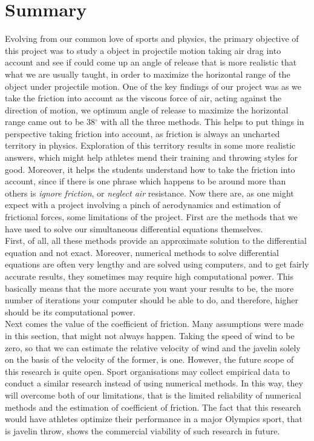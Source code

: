 \documentclass[12pt]{article}
\begin{document}
\section{Summary}
\label{sec:summary}
Evolving from our common love of sports and physics, the primary objective of this project was to study a object in projectile motion taking air drag into account and see if could come up an angle of release that is more realistic that what we are usually taught, in order to maximize the horizontal range of the object under projectile motion. One of the key findings of our project was as we take the friction into account as the viscous force of air, acting against the direction of motion, we optimum angle of release to maximize the horizontal range came out to be 38$^\circ$ with all the three methods. This helps to put things in perspective taking friction into account, as friction is always an uncharted territory in physics. Exploration of this territory results in some more realistic answers, which might help athletes mend their training and throwing styles for good. Moreover, it helps the students understand how to take the friction into account, since if there is one phrase which happens to be around more than others is \textit{ignore friction}, or \textit{neglect air} resistance. Now there are, as one might expect with a project involving a pinch of aerodynamics and estimation of frictional forces, some limitations of the project. First are the methods that we have used to solve our simultaneous differential equations themselves. \\
First, of all, all these methods provide an approximate solution to the differential equation and not exact. Moreover, numerical methods to solve differential equations are often very lengthy and are solved using computers, and to get fairly accurate results, they sometimes may require high computational power. This basically means that the more accurate you want your results to be, the more number of iterations your computer should be able to do, and therefore, higher should be its computational power.\\
Next comes the value of the coefficient of friction. Many assumptions were made in this section, that might not always happen. Taking the speed of wind to be zero, so that we can estimate the relative velocity of wind and the javelin solely on the basis of the velocity of the former, is one. However, the future scope of this research is quite open. Sport organisations may collect empirical data to conduct a similar research instead of using numerical methods. In this way, they will overcome both of our limitations, that is the limited reliability of numerical methods and the estimation of coefficient of friction. The fact that this research would have athletes optimize their performance in a major Olympics sport, that is javelin throw, shows the commercial viability of such research in future. 
\end{document}
